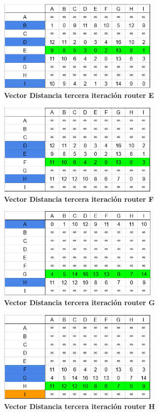 \documentclass[12pt]{article}
\begin{document}
\begin{figure}[H] 
\centering 
\includegraphics[width=0.7\textwidth]{imagenes/3E3.png} \caption{\small \textbf{Vector Distancia tercera iteración router E}}
\label{fig:diagrama_77} 
\end{figure}
\begin{figure}[H] 
\centering 
\includegraphics[width=0.7\textwidth]{imagenes/3F3.png} \caption{\small \textbf{Vector Distancia tercera iteración router F}}
\label{fig:diagrama_78} 
\end{figure}
\begin{figure}[H] 
\centering 
\includegraphics[width=0.7\textwidth]{imagenes/3G3.png} \caption{\small \textbf{Vector Distancia tercera iteración router G}}
\label{fig:diagrama_79} 
\end{figure}
\begin{figure}[H] 
\centering 
\includegraphics[width=0.7\textwidth]{imagenes/3H3.png} \caption{\small \textbf{Vector Distancia tercera iteración router H}}
\label{fig:diagrama_80} 
\end{figure}
\end{document}
